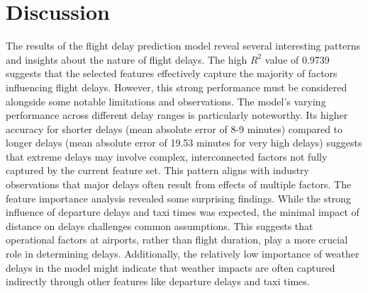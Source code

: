 \section{Discussion}
The results of the flight delay prediction model reveal several interesting patterns and insights about the nature of flight delays. 
The high $R^2$ value of 0.9739 suggests that the selected features effectively capture the majority of factors influencing flight delays. 
However, this strong performance must be considered alongside some notable limitations and observations.
The model's varying performance across different delay ranges is particularly noteworthy. 
Its higher accuracy for shorter delays (mean absolute error of 8-9 minutes) compared to longer delays (mean absolute error of 19.53 minutes for very high delays) suggests that extreme delays may involve complex, interconnected factors not fully captured by the current feature set.
This pattern aligns with industry observations that major delays often result from effects of multiple factors.
The feature importance analysis revealed some surprising findings. 
While the strong influence of departure delays and taxi times was expected, the minimal impact of distance on delays challenges common assumptions. 
This suggests that operational factors at airports, rather than flight duration, play a more crucial role in determining delays. 
Additionally, the relatively low importance of weather delays in the model might indicate that weather impacts are often captured indirectly through other features like departure delays and taxi times.